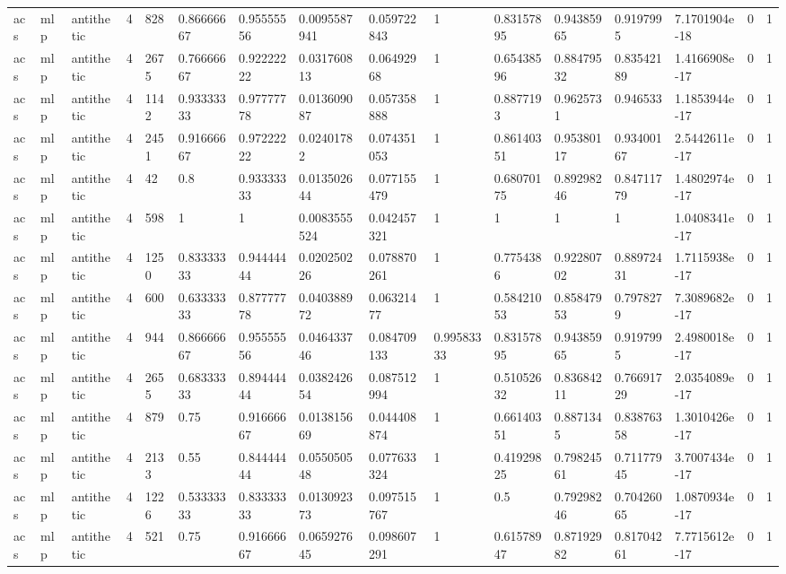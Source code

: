 \begin{tabular}{llllllllllllllll}
acs & mlp & antithetic & 4 & 828 & 0.86666667 & 0.95555556 & 0.0095587941 & 0.059722843 & 1 & 0.83157895 & 0.94385965 & 0.9197995 & 7.1701904e-18 & 0 & 1 \\
acs & mlp & antithetic & 4 & 2675 & 0.76666667 & 0.92222222 & 0.031760813 & 0.06492968 & 1 & 0.65438596 & 0.88479532 & 0.83542189 & 1.4166908e-17 & 0 & 1 \\
acs & mlp & antithetic & 4 & 1142 & 0.93333333 & 0.97777778 & 0.013609087 & 0.057358888 & 1 & 0.8877193 & 0.9625731 & 0.946533 & 1.1853944e-17 & 0 & 1 \\
acs & mlp & antithetic & 4 & 2451 & 0.91666667 & 0.97222222 & 0.02401782 & 0.074351053 & 1 & 0.86140351 & 0.95380117 & 0.93400167 & 2.5442611e-17 & 0 & 1 \\
acs & mlp & antithetic & 4 & 42 & 0.8 & 0.93333333 & 0.013502644 & 0.077155479 & 1 & 0.68070175 & 0.89298246 & 0.84711779 & 1.4802974e-17 & 0 & 1 \\
acs & mlp & antithetic & 4 & 598 & 1 & 1 & 0.0083555524 & 0.042457321 & 1 & 1 & 1 & 1 & 1.0408341e-17 & 0 & 1 \\
acs & mlp & antithetic & 4 & 1250 & 0.83333333 & 0.94444444 & 0.020250226 & 0.078870261 & 1 & 0.7754386 & 0.92280702 & 0.88972431 & 1.7115938e-17 & 0 & 1 \\
acs & mlp & antithetic & 4 & 600 & 0.63333333 & 0.87777778 & 0.040388972 & 0.06321477 & 1 & 0.58421053 & 0.85847953 & 0.7978279 & 7.3089682e-17 & 0 & 1 \\
acs & mlp & antithetic & 4 & 944 & 0.86666667 & 0.95555556 & 0.046433746 & 0.084709133 & 0.99583333 & 0.83157895 & 0.94385965 & 0.9197995 & 2.4980018e-17 & 0 & 1 \\
acs & mlp & antithetic & 4 & 2655 & 0.68333333 & 0.89444444 & 0.038242654 & 0.087512994 & 1 & 0.51052632 & 0.83684211 & 0.76691729 & 2.0354089e-17 & 0 & 1 \\
acs & mlp & antithetic & 4 & 879 & 0.75 & 0.91666667 & 0.013815669 & 0.044408874 & 1 & 0.66140351 & 0.8871345 & 0.83876358 & 1.3010426e-17 & 0 & 1 \\
acs & mlp & antithetic & 4 & 2133 & 0.55 & 0.84444444 & 0.055050548 & 0.077633324 & 1 & 0.41929825 & 0.79824561 & 0.71177945 & 3.7007434e-17 & 0 & 1 \\
acs & mlp & antithetic & 4 & 1226 & 0.53333333 & 0.83333333 & 0.013092373 & 0.097515767 & 1 & 0.5 & 0.79298246 & 0.70426065 & 1.0870934e-17 & 0 & 1 \\
acs & mlp & antithetic & 4 & 521 & 0.75 & 0.91666667 & 0.065927645 & 0.098607291 & 1 & 0.61578947 & 0.87192982 & 0.81704261 & 7.7715612e-17 & 0 & 1 \\

\end{tabular}
